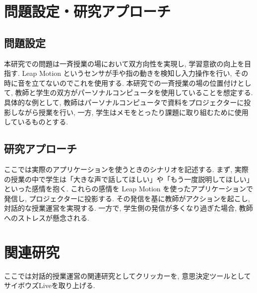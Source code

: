 \documentclass{funthesis}
\begin{document}


\chapter{問題設定・研究アプローチ} %

\section{問題設定}

本研究での問題は一斉授業の場において双方向性を実現し, 学習意欲の向上を目指す. Leap Motion というセンサが手や指の動きを検知し入力操作を行い, その時に音を立てないのでこれを使用する. 本研究での一斉授業の場の位置付けとして, 教師と学生の双方がパーソナルコンピュータを使用していることを想定する. 具体的な例として, 教師はパーソナルコンピュータで資料をプロジェクターに投影しながら授業を行い, 一方, 学生はメモをとったり課題に取り組むために使用しているものとする.


\section{研究アプローチ}
ここでは実際のアプリケーションを使うときのシナリオを記述する. まず, 実際の授業の中で学生は「大きな声で話してほしい」や「もう一度説明してほしい」といった感情を抱く. これらの感情を Leap Motion を使ったアプリケーションで発信し, プロジェクターに投影する. その発信を基に教師がアクションを起こし, 対話的な授業運営を実現する. 一方で, 学生側の発信が多くなり過ぎた場合, 教師へのストレスが懸念される. 

\chapter{関連研究}
ここでは対話的授業運営の関連研究としてクリッカーを, 意思決定ツールとしてサイボウズLiveを取り上げる.
\end{document}
